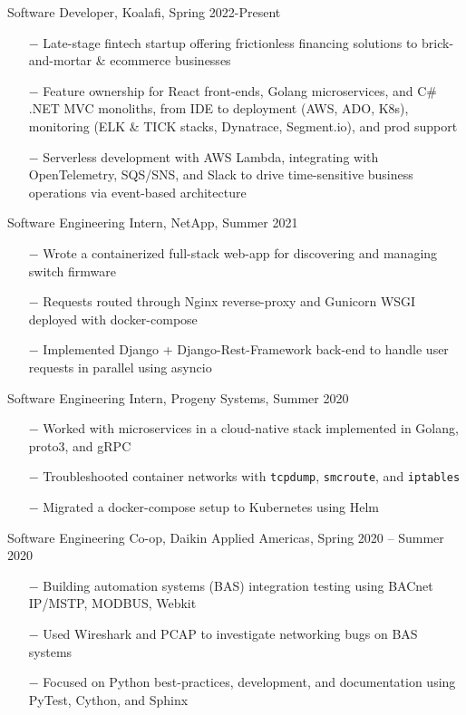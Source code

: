 \documentclass{article}
\newcommand{\code}[1]{\texttt{#1}} %
\begin{document}
{\setlength{\leftskip}{15pt}

{\selectfont Software Developer, Koalafi, Spring 2022-Present}
\vspace{-5pt}
\begin{itemize}
	\setlength{\leftskip}{15pt}
	\setlength\itemsep{-0.5em}
    \item[$-$] Late-stage fintech startup offering frictionless financing solutions to brick-and-mortar \& ecommerce businesses
    \item[$-$] Feature ownership for React front-ends, Golang microservices, and C\# .NET MVC monoliths, from IDE to deployment (AWS, ADO, K8s), monitoring (ELK \& TICK stacks, Dynatrace, Segment.io), and prod support
    \item[$-$] Serverless development with AWS Lambda, integrating with OpenTelemetry, SQS/SNS, and Slack to drive time-sensitive business operations via event-based architecture
\end{itemize}

{\selectfont Software Engineering Intern, NetApp, Summer 2021}
\vspace{-5pt}
\begin{itemize}
	\setlength{\leftskip}{15pt}
	\setlength\itemsep{-0.5em}
	\item[$-$] Wrote a containerized full-stack web-app for discovering and managing switch firmware
	\item[$-$] Requests routed through Nginx reverse-proxy and Gunicorn WSGI deployed with docker-compose
	\item[$-$] Implemented Django + Django-Rest-Framework back-end to handle user requests in parallel using asyncio
\end{itemize}


{\selectfont Software Engineering Intern, Progeny Systems, Summer 2020}
\vspace{-5pt}
\begin{itemize}
	\setlength{\leftskip}{15pt}
	\setlength\itemsep{-0.5em}
	\item[$-$] Worked with microservices in a cloud-native stack implemented in Golang, proto3, and gRPC 
	\item[$-$] Troubleshooted container networks with \code{tcpdump}, \code{smcroute}, and \code{iptables}
	\item[$-$] Migrated a docker-compose setup to Kubernetes using Helm
\end{itemize}


{\selectfont Software Engineering Co-op, Daikin Applied Americas, Spring 2020 – Summer 2020}
\vspace{-5pt}
\begin{itemize}
	\setlength{\leftskip}{15pt}
	\setlength\itemsep{-0.5em}
	\item[$-$] Building automation systems (BAS) integration testing using BACnet IP/MSTP, MODBUS, Webkit 
	\item[$-$] Used Wireshark and PCAP to investigate networking bugs on BAS systems
	\item[$-$] Focused on Python best-practices, development, and documentation using PyTest, Cython, and Sphinx
\end{itemize}

}
\end{document}
